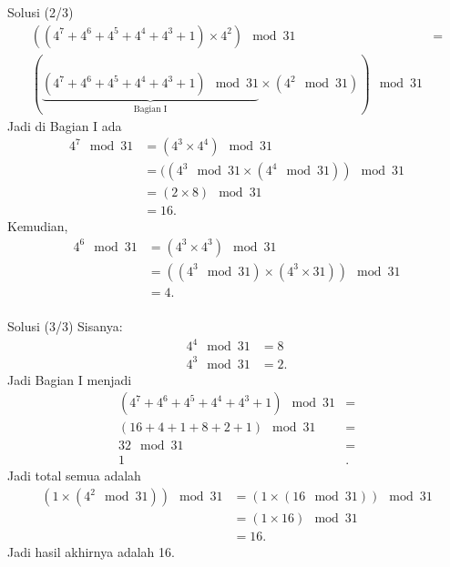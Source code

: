 \documentclass[english,t]{beamer}
\begin{document}
\begin{frame}{Solusi (2/3)}
	\begin{align*}
			((4^7 + 4^6 + 4^5 +4^4 +4^3 + 1) \times 4^2 )  \mod  31 &= \\
			        (\underbrace{(4^7 + 4^6 + 4^5 +4^4 +4^3 + 1) \mod 31}_{\text{Bagian I}}  \times (4^2  \mod 31) ) \mod  31 &
	\end{align*}
	Jadi di Bagian I ada 
	\begin{align*}
		4^7 \mod 31 &= (4^3 \times 4^4) \mod 31 \\
		                   &= ( (4^3 \mod 31 \times (4^4 \mod 31)) \mod 31 \\
		                   &= (2 \times 8) \mod 31 \\
		                   &= 16.
	\end{align*}
	Kemudian,
	\begin{align*}
		4^6 \mod 31 &= (4^3 \times 4^3) \mod 31 \\
		            &= ( (4^3 \mod 31) \times (4^3 \times 31) ) \mod 31 \\
		            &= 4. \\
	\end{align*}
\end{frame}

\begin{frame}{Solusi (3/3)}
	Sisanya:
	\begin{align*}
		4^4 \mod 31 &= 8 \\
		4^3 \mod 31 &= 2.                        
	\end{align*}	
	Jadi Bagian I menjadi
	\begin{align*}
		(4^7 + 4^6 + 4^5 +4^4 +4^3 + 1) \mod 31 &= \\
		(16 + 4 + 1 + 8 + 2 + 1) \mod 31 &=  \\
		32 \mod 31 &= \\
		1 &.
	\end{align*}
	Jadi total semua adalah
	\begin{align*}
			( 1 \times (4^2 \mod 31)) \mod 31 &= ( 1 \times (16 \mod 31)) \mod 31 \\
			                                  &= ( 1 \times 16 ) \mod 31 \\ 
			                                  &= 16.  
	\end{align*}	
	Jadi hasil akhirnya adalah 16.
\end{frame}
\end{document}
